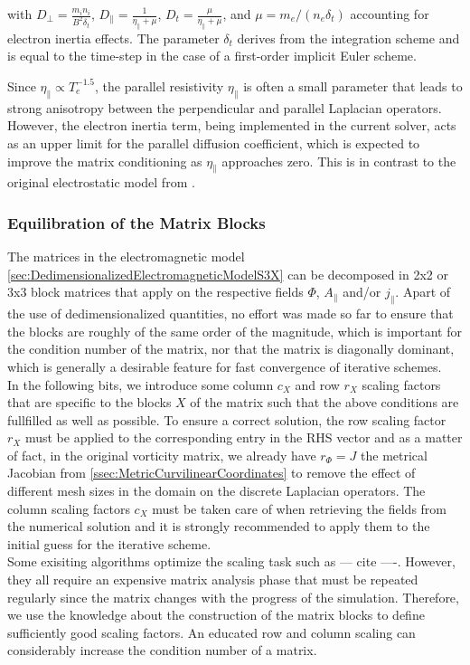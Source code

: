 with $D_\perp = \frac{m_i n_i}{B^2 \delta_t}$, $D_\parallel = \frac{1}{\eta_\parallel + \mu}$, $D_t = \frac{\mu}{\eta_\parallel + \mu}$, and $\mu = m_e / (n_e \delta_t)$ accounting for electron inertia effects. The parameter $\delta_t$ derives from the integration scheme and is equal to the time-step in the case of a first-order implicit Euler scheme. \newline

Since $\eta_\parallel \propto T_e^{-1.5}$, the parallel resistivity $\eta_\parallel$ is often a small parameter that leads to strong anisotropy between the perpendicular and parallel Laplacian operators. However, the electron inertia term, being implemented in the current solver, acts as an upper limit for the parallel diffusion coefficient, which is expected to improve the matrix conditioning as $\eta_\parallel$ approaches zero. This is in contrast to the original electrostatic model from \cite{Bufferand2021}. \newline


\subsubsection{Equilibration of the Matrix Blocks}
\label{ssec:equilibrationBLockMatrices}
The matrices in the electromagnetic model \autoref{sec:DedimensionalizedElectromagneticModelS3X} can be decomposed in 2x2 or 3x3 block matrices that apply on the respective fields $\Phi$, $A_\parallel$ and/or $j_\parallel$. Apart of the use of dedimensionalized quantities, no effort was made so far to ensure that the blocks are roughly of the same order of the magnitude, which is important for the condition number of the matrix, nor that the matrix is diagonally dominant, which is generally a desirable feature for fast convergence of iterative schemes. \\
In the following bits, we introduce some column $c_X$ and row $r_X$ scaling factors that are specific to the blocks $X$ of the matrix such that the above conditions are fullfilled as well as possible. To ensure a correct solution, the row scaling factor $r_X$ must be applied to the corresponding entry in the RHS vector and as a matter of fact, in the original vorticity matrix, we already have $r_\Phi = J$ the metrical Jacobian from \autoref{ssec:MetricCurvilinearCoordinates} to remove the effect of different mesh sizes in the domain on the discrete Laplacian operators. The column scaling factors $c_X$ must be taken care of when retrieving the fields from the numerical solution and it is strongly recommended to apply them to the initial guess for the iterative scheme. \\ 
Some exisiting algorithms optimize the scaling task such as  --- cite ----. However, they all require an expensive matrix analysis phase that must be repeated regularly since the matrix changes with the progress of the simulation. Therefore, we use the knowledge about the construction of the matrix blocks to define sufficiently good scaling factors. An educated row and column scaling can considerably increase the condition number of a matrix\cite{van1969condition}.\\

